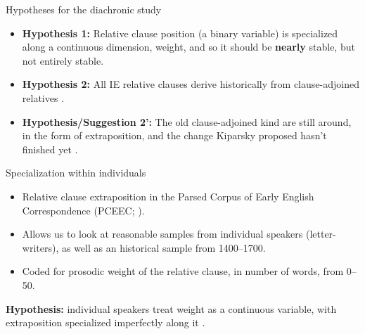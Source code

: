 \documentclass[hyperref={pdfpagelabels=false}]{beamer}
\begin{document}
\begin{frame}{Hypotheses for the diachronic study}
\begin{itemize}
    \item \textbf{Hypothesis 1:} Relative clause position (a binary variable) is specialized along a continuous dimension, weight, and so it should be \textbf{nearly} stable, but not entirely stable.
    \item \textbf{Hypothesis 2:} All IE relative clauses derive historically from clause-adjoined relatives \small{\citep{kiparsky1995}}.
        \item \textbf{Hypothesis/Suggestion 2':} The old clause-adjoined kind are still around, in the form of extraposition, and the change Kiparsky proposed hasn't finished yet \small{\citep{wallenbergForthcoming}}.
    \end{itemize}

\end{frame}




\begin{frame}{Specialization within individuals}
\begin{itemize}
	\item Relative clause extraposition in the Parsed Corpus of Early English Correspondence  (PCEEC; \citealt{pceec}).
	\item Allows us to look at reasonable samples from individual speakers (letter-writers), as well as an historical sample from 1400--1700.
	\item Coded for prosodic weight of the relative clause, in number of words, from 0--50.
\end{itemize}
	\textbf{Hypothesis:} individual speakers treat weight as a continuous variable, with extraposition specialized imperfectly along it \citep[as suggested by][]{antonmackenzie2011a}.

\end{frame}
\end{document}
